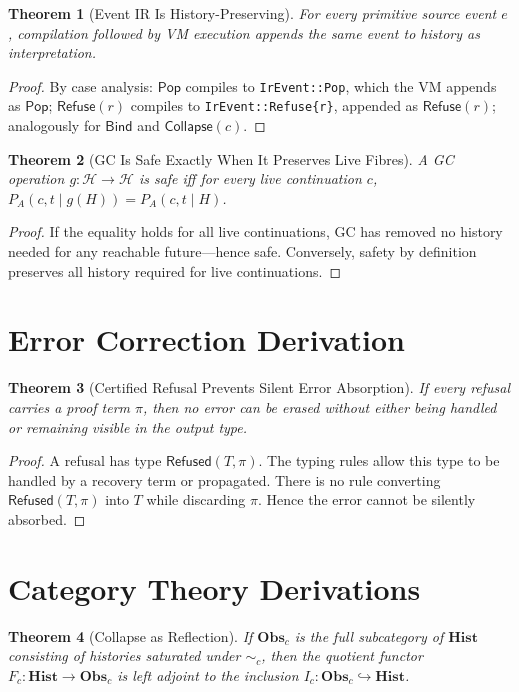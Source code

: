 \documentclass[12pt, a4paper, openany]{book}
\theoremstyle{plain}
\newtheorem{theorem}{Theorem}[chapter]
\theoremstyle{definition}
\theoremstyle{remark}
\newcommand{\Pop}{\mathsf{Pop}}
\newcommand{\Refuse}{\mathsf{Refuse}}
\newcommand{\Bind}{\mathsf{Bind}}
\newcommand{\Collapse}{\mathsf{Collapse}}
\newcommand{\Hist}{\mathbf{Hist}}
\newcommand{\Obs}{\mathbf{Obs}}
\newcommand{\calH}{\mathcal{H}}
\newcommand{\Rfsd}{\mathsf{Refused}}
\begin{document}
\begin{theorem}[Event IR Is History-Preserving]
For every primitive source event $e$, compilation followed by VM execution appends
the same event to history as interpretation.
\end{theorem}

\begin{proof}
By case analysis: $\Pop$ compiles to \texttt{IrEvent::Pop}, which the VM appends
as $\Pop$; $\Refuse(r)$ compiles to \texttt{IrEvent::Refuse\{r\}}, appended as
$\Refuse(r)$; analogously for $\Bind$ and $\Collapse(c)$.
\end{proof}

\begin{theorem}[GC Is Safe Exactly When It Preserves Live Fibres]
A GC operation $g : \calH \to \calH$ is safe iff for every live continuation $c$,
$P_A(c, t \mid g(H)) = P_A(c, t \mid H)$.
\end{theorem}

\begin{proof}
If the equality holds for all live continuations, GC has removed no history needed
for any reachable future---hence safe. Conversely, safety by definition preserves
all history required for live continuations.
\end{proof}

\section{Error Correction Derivation}

\begin{theorem}[Certified Refusal Prevents Silent Error Absorption]
If every refusal carries a proof term $\pi$, then no error can be erased without
either being handled or remaining visible in the output type.
\end{theorem}

\begin{proof}
A refusal has type $\Rfsd(T, \pi)$. The typing rules allow this type to be handled
by a recovery term or propagated. There is no rule converting $\Rfsd(T, \pi)$ into
$T$ while discarding $\pi$. Hence the error cannot be silently absorbed.
\end{proof}

\section{Category Theory Derivations}

\begin{theorem}[Collapse as Reflection]
If $\Obs_c$ is the full subcategory of $\Hist$ consisting of histories saturated
under $\sim_c$, then the quotient functor $F_c : \Hist \to \Obs_c$ is left
adjoint to the inclusion $I_c : \Obs_c \hookrightarrow \Hist$.
\end{theorem}
\end{document}
